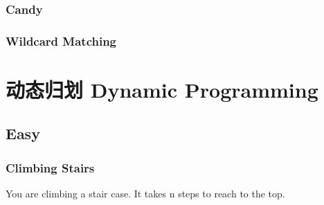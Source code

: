 \documentclass[11pt]{book}
\begin{document}
\subsection{Candy}
\label{sec-13-2-2}
\subsection{Wildcard Matching}
\label{sec-13-2-3}
\subsection{}
\label{sec-13-2-4}

\chapter{动态归划 Dynamic Programming}
\label{sec-14}
\section{Easy}
\label{sec-14-1}
\subsection{Climbing Stairs}
\label{sec-14-1-1}
You are climbing a stair case. It takes n steps to reach to the top.
\end{document}
